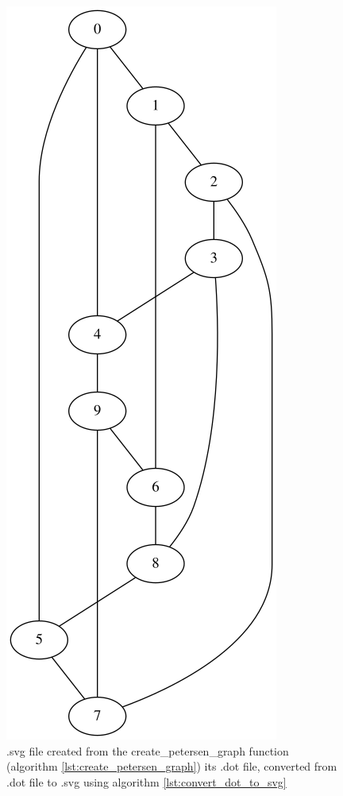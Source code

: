 \begin{figure}[!htbp]
  \includegraphics[]{create_petersen_graph.png}
  \caption{
    .svg file created from the create\_petersen\_graph function 
    (algorithm \ref{lst:create_petersen_graph}) its .dot file, 
    converted from .dot file to .svg using algorithm 
    \ref{lst:convert_dot_to_svg}
  }
  \label{fig:create_petersen_graph.svg}
\end{figure}

